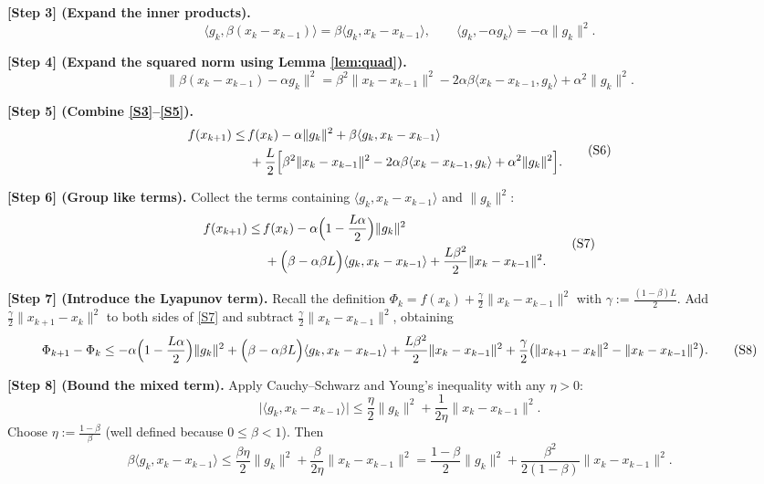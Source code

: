 \documentclass{article}
\begin{document}
\noindent\textbf{[Step 3] (Expand the inner products).}  
\[
\langle g_{k},\beta (x_{k}-x_{k-1})\rangle = \beta\langle g_{k},x_{k}-x_{k-1}\rangle,
\qquad
\langle g_{k},-\alpha g_{k}\rangle = -\alpha\|g_{k}\|^{2}.
\tag{S4}
\]

\noindent\textbf{[Step 4] (Expand the squared norm using Lemma \ref{lem:quad}).}  
\[
\|\beta (x_{k}-x_{k-1})-\alpha g_{k}\|^{2}
= \beta^{2}\|x_{k}-x_{k-1}\|^{2}
-2\alpha\beta\langle x_{k}-x_{k-1},g_{k}\rangle
+\alpha^{2}\|g_{k}\|^{2}.
\tag{S5}
\]

\noindent\textbf{[Step 5] (Combine \eqref{S3}–\eqref{S5}).}  
\[
\begin{aligned}
f(x_{k+1})\le &\, f(x_{k})
-\alpha\|g_{k}\|^{2}
+\beta\langle g_{k},x_{k}-x_{k-1}\rangle\\
&\;+\frac{L}{2}\Bigl[
\beta^{2}\|x_{k}-x_{k-1}\|^{2}
-2\alpha\beta\langle x_{k}-x_{k-1},g_{k}\rangle
+\alpha^{2}\|g_{k}\|^{2}
\Bigr].
\end{aligned}
\tag{S6}
\]

\noindent\textbf{[Step 6] (Group like terms).}  
Collect the terms containing $\langle g_{k},x_{k}-x_{k-1}\rangle$ and $\|g_{k}\|^{2}$:
\[
\begin{aligned}
f(x_{k+1})\le &\, f(x_{k})
-\alpha\Bigl(1-\frac{L\alpha}{2}\Bigr)\|g_{k}\|^{2}\\
&\;+\Bigl(\beta-\alpha\beta L\Bigr)\langle g_{k},x_{k}-x_{k-1}\rangle
+\frac{L\beta^{2}}{2}\|x_{k}-x_{k-1}\|^{2}.
\end{aligned}
\tag{S7}
\]

\noindent\textbf{[Step 7] (Introduce the Lyapunov term).}  
Recall the definition $\Phi_{k}=f(x_{k})+\frac{\gamma}{2}\|x_{k}-x_{k-1}\|^{2}$ with $\gamma:=\frac{(1-\beta)L}{2}$.  
Add $\frac{\gamma}{2}\|x_{k+1}-x_{k}\|^{2}$ to both sides of \eqref{S7} and subtract $\frac{\gamma}{2}\|x_{k}-x_{k-1}\|^{2}$, obtaining
\[
\Phi_{k+1}-\Phi_{k}
\le -\alpha\Bigl(1-\frac{L\alpha}{2}\Bigr)\|g_{k}\|^{2}
+\Bigl(\beta-\alpha\beta L\Bigr)\langle g_{k},x_{k}-x_{k-1}\rangle
+\frac{L\beta^{2}}{2}\|x_{k}-x_{k-1}\|^{2}
+\frac{\gamma}{2}\bigl(\|x_{k+1}-x_{k}\|^{2}-\|x_{k}-x_{k-1}\|^{2}\bigr).
\tag{S8}
\]

\noindent\textbf{[Step 8] (Bound the mixed term).}  
Apply Cauchy–Schwarz and Young’s inequality with any $\eta>0$:
\[
\bigl|\langle g_{k},x_{k}-x_{k-1}\rangle\bigr|
\le \frac{\eta}{2}\|g_{k}\|^{2}+\frac{1}{2\eta}\|x_{k}-x_{k-1}\|^{2}.
\tag{S9}
\]
Choose $\eta:=\frac{1-\beta}{\beta}$ (well defined because $0\le\beta<1$). Then
\[
\beta\langle g_{k},x_{k}-x_{k-1}\rangle
\le \frac{\beta\eta}{2}\|g_{k}\|^{2}
+\frac{\beta}{2\eta}\|x_{k}-x_{k-1}\|^{2}
= \frac{1-\beta}{2}\|g_{k}\|^{2}
+\frac{\beta^{2}}{2(1-\beta)}\|x_{k}-x_{k-1}\|^{2}.
\tag{S10}
\]
\end{document}
